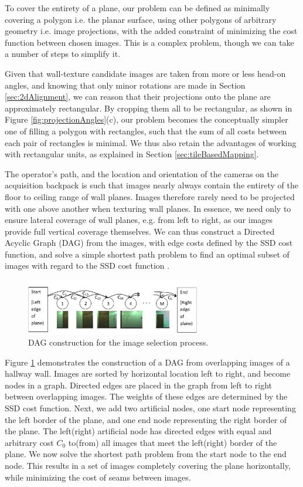 \documentclass[]{spie}  %
\begin{document}
To cover the entirety of a plane, our problem can be defined as
minimally covering a polygon i.e. the planar surface, using other
polygons of arbitrary geometry i.e. image projections, with the added
constraint of minimizing the cost function between chosen images.
This is a complex problem, though we can take a number of steps to
simplify it.

Given that wall-texture candidate images are taken from more or less
head-on angles, and knowing that only minor rotations are made in
Section \ref{sec:2dAlignment}, we can reason that their projections
onto the plane are approximately rectangular. By cropping them all to
be rectangular, as shown in Figure \ref{fig:projectionAngles}(c), our
problem becomes the conceptually simpler one of filling a polygon with
rectangles, such that the sum of all costs between each pair of
rectangles is minimal. We thus also retain the advantages of working
with rectangular units, as explained in Section
\ref{sec:tileBasedMapping}.

The operator's path, and the location and orientation of the cameras
on the acquisition backpack is such that images nearly always contain
the entirety of the floor to ceiling range of wall planes. Images
therefore rarely need to be projected with one above another when
texturing wall planes. In essence, we need only to ensure lateral
coverage of wall planes, e.g. from left to right, as our images
provide full vertical coverage themselves. We can thus construct a
Directed Acyclic Graph (DAG) from the images, with edge costs defined
by the SSD cost function, and solve a simple shortest path problem to
find an optimal subset of images with regard to the SSD cost function
\cite{dijkstra}.

\begin{figure}
  \centering
  \includegraphics[width=3in]{dagCreation.pdf}
  \caption{DAG construction for the image selection process. \\}
  \label{fig:dagCreation}
\end{figure}

Figure \ref{fig:dagCreation} demonstrates the construction of a DAG
from overlapping images of a hallway wall. Images are sorted by
horizontal location left to right, and become nodes in a
graph. Directed edges are placed in the graph from left to right
between overlapping images. The weights of these edges are determined
by the SSD cost function. Next, we add two artificial nodes, one start
node representing the left border of the plane, and one end node
representing the right border of the plane. The left(right) artificial
node has directed edges with equal and arbitrary cost $C_0$ to(from)
all images that meet the left(right) border of the plane. We now solve
the shortest path problem from the start node to the end node. This
results in a set of images completely covering the plane horizontally,
while minimizing the cost of seams between images.
\end{document}
